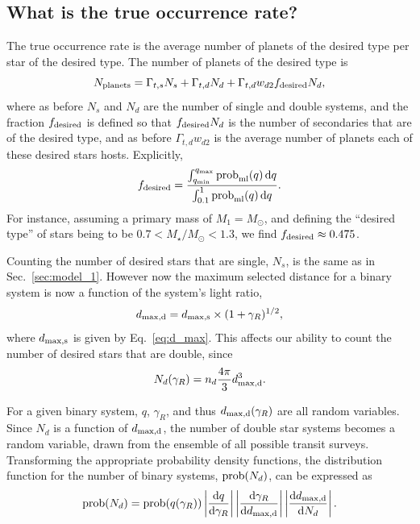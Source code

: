 \documentclass{emulateapj}
\begin{document}
\subsection{What is the true occurrence rate?}

The true occurrence rate is the average number of planets of the desired type 
per star of the desired type.
The number of planets of the desired type is
\begin{equation}
N_{\rm planets} = \Gamma_{t,s}N_s + \Gamma_{t,d}N_d + 
\Gamma_{t,d}w_{d2}f_{{\rm desired}}N_d,
\end{equation}
where as before $N_s$ and $N_d$ are the number of single and double systems, 
and the fraction $f_{{\rm desired}}$ is defined so that $f_{{\rm desired}} 
N_d$ is the number of secondaries that are of the desired type, and as before 
$\Gamma_{t,d}w_{d2}$ is the average number of planets each of these desired 
stars hosts.
Explicitly,
\begin{equation}
f_{\rm desired} = \frac{\int_{q_{\rm min}}^{q_{\rm max}} {\rm prob}_{\rm 
        ml}(q)\,{\rm d}q }
{\int_{0.1}^{1} {\rm prob}_{\rm 
        ml}(q)\,{\rm d}q}.
\end{equation}
For instance, assuming a primary mass of $M_1 = M_\odot$, and defining the 
``desired type'' of stars being to be $0.7<M_\star/M_\odot<1.3$, we find 
$f_{\rm desired}\approx0.475$.

Counting the number of desired stars that are single, $N_s$, is the same as in 
Sec.~\ref{sec:model_1}. However now the maximum selected distance for a binary 
system is now a function of the system's light ratio,
\begin{equation}
d_{\rm max,d} =
d_{\rm max,s}\times (1+\gamma_R)^{1/2},
\end{equation}
where $d_{\rm max,s}$ is given by Eq.~\ref{eq:d_max}.
This affects our ability to count the number of desired stars that are double,
since
\begin{equation}
N_d(\gamma_R) = n_d \frac{4\pi}{3} d_{\rm max,d}^3.
\end{equation}

For a given binary system, $q$, $\gamma_R$, and thus $d_{\rm 
	max,d}(\gamma_R)$ are all random variables.
Since $N_d$ is a function of $d_{\rm max,d}$, 
the number of double star systems becomes a random variable, drawn from the 
ensemble of all possible transit surveys.
Transforming the appropriate probability density functions, the distribution 
function for the number of binary systems,
${\rm prob}(N_d)$, can be expressed as 
\begin{equation}
{\rm prob}(N_d) = {\rm prob}(q(\gamma_R)) 
\left| \frac{{\rm d}q}{{\rm d}\gamma_R}  \right|
\left| \frac{{\rm d}\gamma_R}{{\rm d}d_{\rm max,d}}  \right|				
\left| \frac{{\rm d}d_{\rm max,d}}{{\rm d}N_d}  \right|.
\label{eq:prob_Nd_raw}
\end{equation}
\end{document}
